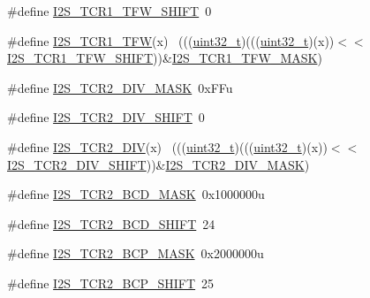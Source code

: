 \begin{DoxyCompactItemize}
\#define \hyperlink{group___i2_s___register___masks_ga2a0a40da6ee3bcfa9f8088dcfbb676c7}{I2\+S\+\_\+\+T\+C\+R1\+\_\+\+T\+F\+W\+\_\+\+S\+H\+I\+FT}~0
\item 
\#define \hyperlink{group___i2_s___register___masks_gab5159a5116071bed637234b0f766bebd}{I2\+S\+\_\+\+T\+C\+R1\+\_\+\+T\+FW}(x)                                                ~(((\hyperlink{_p_e___types_8h_a33594304e786b158f3fb30289278f5af}{uint32\+\_\+t})(((\hyperlink{_p_e___types_8h_a33594304e786b158f3fb30289278f5af}{uint32\+\_\+t})(x))$<$$<$\hyperlink{group___i2_s___register___masks_ga2a0a40da6ee3bcfa9f8088dcfbb676c7}{I2\+S\+\_\+\+T\+C\+R1\+\_\+\+T\+F\+W\+\_\+\+S\+H\+I\+FT}))\&\hyperlink{group___i2_s___register___masks_ga26d9f7626514208432dc7850225cc752}{I2\+S\+\_\+\+T\+C\+R1\+\_\+\+T\+F\+W\+\_\+\+M\+A\+SK})
\item 
\#define \hyperlink{group___i2_s___register___masks_ga9bbd597b1d3a839f74d15c3b6c309bb7}{I2\+S\+\_\+\+T\+C\+R2\+\_\+\+D\+I\+V\+\_\+\+M\+A\+SK}~0x\+F\+Fu
\item 
\#define \hyperlink{group___i2_s___register___masks_gad553f8b1c1cc03ded483d997640b410a}{I2\+S\+\_\+\+T\+C\+R2\+\_\+\+D\+I\+V\+\_\+\+S\+H\+I\+FT}~0
\item 
\#define \hyperlink{group___i2_s___register___masks_ga5e139ccca8c7599f321f14dce3b8782b}{I2\+S\+\_\+\+T\+C\+R2\+\_\+\+D\+IV}(x)                                                ~(((\hyperlink{_p_e___types_8h_a33594304e786b158f3fb30289278f5af}{uint32\+\_\+t})(((\hyperlink{_p_e___types_8h_a33594304e786b158f3fb30289278f5af}{uint32\+\_\+t})(x))$<$$<$\hyperlink{group___i2_s___register___masks_gad553f8b1c1cc03ded483d997640b410a}{I2\+S\+\_\+\+T\+C\+R2\+\_\+\+D\+I\+V\+\_\+\+S\+H\+I\+FT}))\&\hyperlink{group___i2_s___register___masks_ga9bbd597b1d3a839f74d15c3b6c309bb7}{I2\+S\+\_\+\+T\+C\+R2\+\_\+\+D\+I\+V\+\_\+\+M\+A\+SK})
\item 
\#define \hyperlink{group___i2_s___register___masks_gacd5946c8455382794be20e9454c7d688}{I2\+S\+\_\+\+T\+C\+R2\+\_\+\+B\+C\+D\+\_\+\+M\+A\+SK}~0x1000000u
\item 
\#define \hyperlink{group___i2_s___register___masks_ga2c6578a7b0e95314b9211083cd31494e}{I2\+S\+\_\+\+T\+C\+R2\+\_\+\+B\+C\+D\+\_\+\+S\+H\+I\+FT}~24
\item 
\#define \hyperlink{group___i2_s___register___masks_gacd80d1c94434950d1e8bd33024b04018}{I2\+S\+\_\+\+T\+C\+R2\+\_\+\+B\+C\+P\+\_\+\+M\+A\+SK}~0x2000000u
\item 
\#define \hyperlink{group___i2_s___register___masks_gaafb7626321ba09185e45c9136b804732}{I2\+S\+\_\+\+T\+C\+R2\+\_\+\+B\+C\+P\+\_\+\+S\+H\+I\+FT}~25

\end{DoxyCompactItemize}
